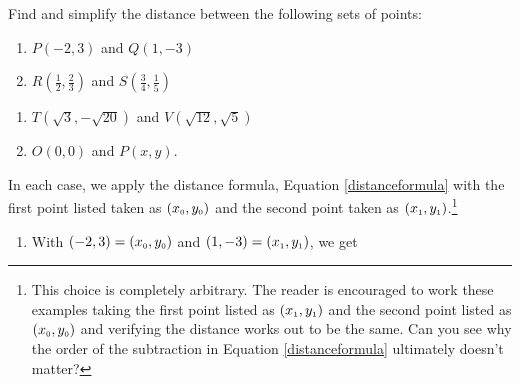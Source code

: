 \begin{ex} \label{distanceexample1} Find and simplify the distance between the following sets of points:

\begin{multicols}{2}
\begin{enumerate}

\item $P(-2,3)$ and  $Q(1,-3)$ 

\item $R\left( \frac{1}{2}, \frac{2}{3}\right)$ and $S\left( \frac{3}{4}, \frac{1}{5}\right)$ 

\setcounter{HW}{\value{enumi}}
\end{enumerate}
\end{multicols}

\begin{multicols}{2}
\begin{enumerate}
\setcounter{enumi}{\value{HW}}

\item  $T(\sqrt{3}, -\sqrt{20})$ and $V(\sqrt{12}, \sqrt{5})$

\item   $O(0,0)$ and $P(x,y)$. 

\end{enumerate}
\end{multicols}

\medskip

  In each case, we apply the distance formula, Equation \ref{distanceformula} with the first point listed taken as  $\left(x_{\mbox{\tiny$0$}}, y_{\mbox{\tiny$0$}}\right)$ and the second point taken as $\left(x_{\mbox{\tiny$1$}}, y_{\mbox{\tiny$1$}}\right)$.\footnote{This choice is completely arbitrary.  The reader is encouraged to work these examples taking the first point listed as $\left(x_{\mbox{\tiny$1$}}, y_{\mbox{\tiny$1$}}\right)$ and the second point listed as $\left(x_{\mbox{\tiny$0$}}, y_{\mbox{\tiny$0$}}\right)$ and verifying the distance works out to be the same.  Can you see why the order of the subtraction in Equation \ref{distanceformula} ultimately doesn't matter?}

\begin{enumerate}

\item With $(-2,3) =  \left(x_{\mbox{\tiny$0$}}, y_{\mbox{\tiny$0$}}\right)$ and  $(1,-3) = \left(x_{\mbox{\tiny$1$}}, y_{\mbox{\tiny$1$}}\right)$, we get


\end{enumerate}
\end{ex}
